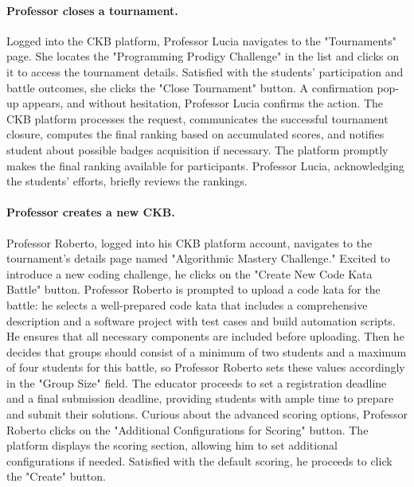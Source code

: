 \paragraph*{Professor closes a tournament.}
Logged into the CKB platform, Professor Lucia navigates to the "Tournaments" page. She locates the "Programming Prodigy Challenge" in the list and clicks
on it to access the tournament details. Satisfied with the students' participation and battle outcomes, she clicks the "Close Tournament" button.
A confirmation pop-up appears, and without hesitation, Professor Lucia confirms the action. The CKB platform processes the request, communicates 
the successful tournament closure, computes the final ranking based on accumulated scores, and notifies student about possible badges acquisition if necessary.
The platform promptly makes the final ranking available for participants. Professor Lucia, acknowledging the students' efforts, briefly reviews the rankings. 

\paragraph*{Professor creates a new CKB.}
Professor Roberto, logged into his CKB platform account, navigates to the tournament's details page named "Algorithmic Mastery Challenge." 
Excited to introduce a new coding challenge, he clicks on the "Create New Code Kata Battle" button. 
Professor Roberto is prompted to upload a code kata for the battle: he selects a well-prepared code kata that includes a comprehensive description and a software project with test cases and build automation scripts. 
He ensures that all necessary components are included before uploading.
Then he decides that groups should consist of a minimum of two students and a maximum of four students for this battle, so Professor Roberto sets these values accordingly in the "Group Size" field.
The educator proceeds to set a registration deadline and a final submission deadline, providing students with ample time to prepare and submit their solutions.
Curious about the advanced scoring options, Professor Roberto clicks on the "Additional Configurations for Scoring" button. 
The platform displays the scoring section, allowing him to set additional configurations if needed. 
Satisfied with the default scoring, he proceeds to click the "Create" button.

